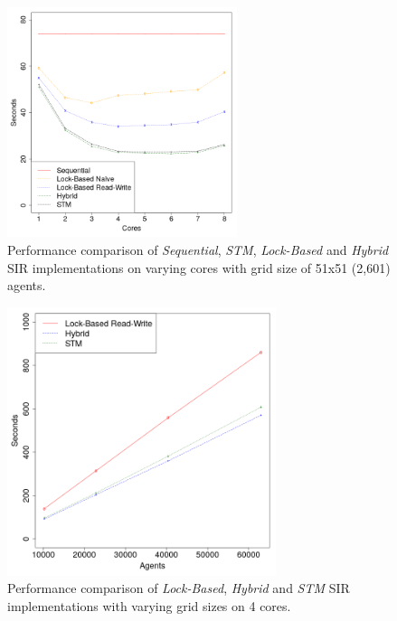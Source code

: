 \documentclass{bmcart}
\begin{document}
\begin{backmatter}
\begin{figure}[h!]
	\includegraphics[width=0.6\textwidth, angle=0]{./sir_varyingcores_constgrid.png}
	\caption{Performance comparison of \textit{Sequential}, \textit{STM}, \textit{Lock-Based} and \textit{Hybrid} SIR implementations on varying cores with grid size of 51x51 (2,601) agents.}
	\label{fig:sir_varyingcores_constgrid}
\end{figure}

\begin{figure}[h!]
	\centering
	\includegraphics[width=0.7\textwidth, angle=0]{./sir_varyinggrid_constcores.png}
	\caption{Performance comparison of \textit{Lock-Based}, \textit{Hybrid} and \textit{STM} SIR implementations with varying grid sizes on 4 cores.}
	\label{fig:sir_varyinggrid_constcores}
\end{figure}


\end{backmatter}
\end{document}
